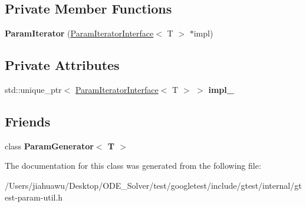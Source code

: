 \subsection*{Private Member Functions}
\begin{DoxyCompactItemize}
\item 
\mbox{\label{classtesting_1_1internal_1_1_param_iterator_acf5ad898e7f50eb82a6c367889aa07c4}} 
{\bfseries Param\+Iterator} (\mbox{\hyperlink{classtesting_1_1internal_1_1_param_iterator_interface}{Param\+Iterator\+Interface}}$<$ T $>$ $\ast$impl)
\end{DoxyCompactItemize}
\subsection*{Private Attributes}
\begin{DoxyCompactItemize}
\item 
\mbox{\label{classtesting_1_1internal_1_1_param_iterator_ab8ca1e4a23e205e4edded0adf42634c9}} 
std\+::unique\+\_\+ptr$<$ \mbox{\hyperlink{classtesting_1_1internal_1_1_param_iterator_interface}{Param\+Iterator\+Interface}}$<$ T $>$ $>$ {\bfseries impl\+\_\+}
\end{DoxyCompactItemize}
\subsection*{Friends}
\begin{DoxyCompactItemize}
\item 
\mbox{\label{classtesting_1_1internal_1_1_param_iterator_ab73a355ae191f2f7eab54b65ca557714}} 
class {\bfseries Param\+Generator$<$ T $>$}
\end{DoxyCompactItemize}


The documentation for this class was generated from the following file\+:\begin{DoxyCompactItemize}
\item 
/\+Users/jiahuawu/\+Desktop/\+O\+D\+E\+\_\+\+Solver/test/googletest/include/gtest/internal/gtest-\/param-\/util.\+h\end{DoxyCompactItemize}
